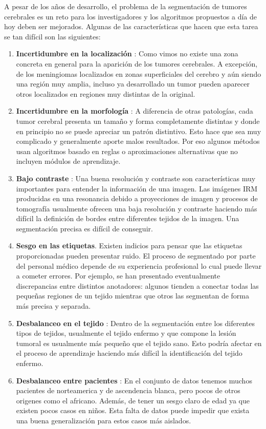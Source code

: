 A pesar de los años de desarrollo, el problema de la segmentación de tumores cerebrales es un reto  para los investigadores y los algoritmos propuestos a día de hoy deben ser mejorados. Algunas de las características que hacen que esta tarea se tan difícil son las siguientes:

\begin{enumerate}
	\item \textbf{Incertidumbre en la localización} : Como vimos no existe una zona concreta en general para la aparición de los tumores cerebrales. A excepción, de los meningiomas localizados en zonas superficiales del cerebro y aún siendo una región muy amplia, incluso ya desarrollado un tumor pueden aparecer otros localizados en regiones muy distintas de la original. 
	\item \textbf{Incertidumbre en la morfología} : A diferencia de otras patologías, cada tumor cerebral presenta un tamaño y forma completamente distintas y donde en principio no se puede apreciar un patrón distintivo. Esto hace que sea muy complicado y generalmente aporte malos resultados. Por eso algunos métodos usan algoritmos basado en reglas o aproximaciones alternativas que no incluyen módulos de aprendizaje.
	
	\item \textbf{Bajo contraste} : Una buena resolución y contraste son características muy importantes para entender la información de una imagen. Las imágenes IRM producidas en una resonancia debido a proyecciones de imagen y procesos de tomografía usualmente ofrecen una baja resolución y contraste haciendo más difícil la definición de bordes entre diferentes tejidos de la imagen. Una segmentación precisa es difícil de conseguir.
	
	\item \textbf{Sesgo en las etiquetas}. Existen indicios para pensar que las etiquetas proporcionadas pueden presentar ruido. El proceso de segmentado por parte del personal médico 
	depende de su experiencia profesional lo cual puede llevar a cometer errores. Por ejemplo, se han presentado eventualmente discrepancias entre distintos anotadores: algunos tienden a conectar todas las pequeñas regiones de un tejido mientras que otros las segmentan de forma más precisa y separada. 
	
	\item \textbf{Desbalanceo en el tejido} : Dentro de la segmentación entre los diferentes tipos de tejidos, usualmente el tejido enfermo y que compone la lesión tumoral es usualmente más pequeño que el tejido sano. Esto podría afectar en el proceso de aprendizaje haciendo más difícil la identificación del tejido enfermo. 
	
	\item \textbf{Desbalanceo entre pacientes} : En el conjunto de datos tenemos muchos pacientes de norteamerica y de ascendencia blanca, pero pocos de otros origenes como el africano. Además, de tener un sesgo claro de edad ya que existen pocos casos en niños. Esta falta de datos puede impedir que exista una buena generalización para estos casos más aislados.
	
\end{enumerate}


